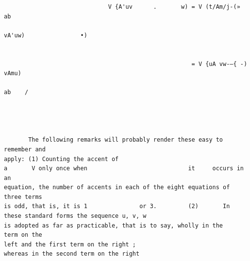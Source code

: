 \documentclass[10pt]{article}
\begin{document}
\begin{verbatim}
                              V {A'uv      .       w) = V (t/Am/j-(»   ab
                                                                          vA'uw)                •)


                                                      = V {uA vw-—{ -) vAmu)
                                                                        ab    /




       The following remarks will probably render these easy to remember and
apply: (1) Counting the accent of                                         a       V only once when                             it     occurs in an
equation, the number of accents in each of the eight equations of three terms
is odd, that is, it is 1               or 3.         (2)       In these standard forms the sequence u, v, w
is adopted as far as practicable, that is to say, wholly in the                                                                       term on the
left and the first term on the right ;                                  whereas in the second term on the right


\end{verbatim}
\clearpage
\end{document}
